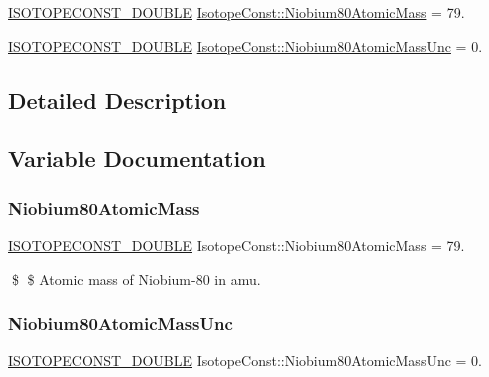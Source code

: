 \begin{DoxyCompactItemize}
\item 
\mbox{\hyperlink{group___isotope_const-_macros_ga8f45a7272ce02c0b4c65c44636ed719a}{I\+S\+O\+T\+O\+P\+E\+C\+O\+N\+S\+T\+\_\+\+D\+O\+U\+B\+LE}} \mbox{\hyperlink{group___isotope_const-_niobium-_nb80_ga0dea4e62632b93872f79f566552b99c3}{Isotope\+Const\+::\+Niobium80\+Atomic\+Mass}} = 79.
\item 
\mbox{\hyperlink{group___isotope_const-_macros_ga8f45a7272ce02c0b4c65c44636ed719a}{I\+S\+O\+T\+O\+P\+E\+C\+O\+N\+S\+T\+\_\+\+D\+O\+U\+B\+LE}} \mbox{\hyperlink{group___isotope_const-_niobium-_nb80_ga2187ca2c7acb731c46b3f6286f133ddc}{Isotope\+Const\+::\+Niobium80\+Atomic\+Mass\+Unc}} = 0.
\end{DoxyCompactItemize}


\subsection{Detailed Description}


\subsection{Variable Documentation}
\mbox{\label{group___isotope_const-_niobium-_nb80_ga0dea4e62632b93872f79f566552b99c3}} 
\subsubsection{\texorpdfstring{Niobium80\+Atomic\+Mass}{Niobium80AtomicMass}}
{\footnotesize\ttfamily \mbox{\hyperlink{group___isotope_const-_macros_ga8f45a7272ce02c0b4c65c44636ed719a}{I\+S\+O\+T\+O\+P\+E\+C\+O\+N\+S\+T\+\_\+\+D\+O\+U\+B\+LE}} Isotope\+Const\+::\+Niobium80\+Atomic\+Mass = 79.}

\$ \$ Atomic mass of Niobium-\/80 in amu. \mbox{\label{group___isotope_const-_niobium-_nb80_ga2187ca2c7acb731c46b3f6286f133ddc}} 
\subsubsection{\texorpdfstring{Niobium80\+Atomic\+Mass\+Unc}{Niobium80AtomicMassUnc}}
{\footnotesize\ttfamily \mbox{\hyperlink{group___isotope_const-_macros_ga8f45a7272ce02c0b4c65c44636ed719a}{I\+S\+O\+T\+O\+P\+E\+C\+O\+N\+S\+T\+\_\+\+D\+O\+U\+B\+LE}} Isotope\+Const\+::\+Niobium80\+Atomic\+Mass\+Unc = 0.}

